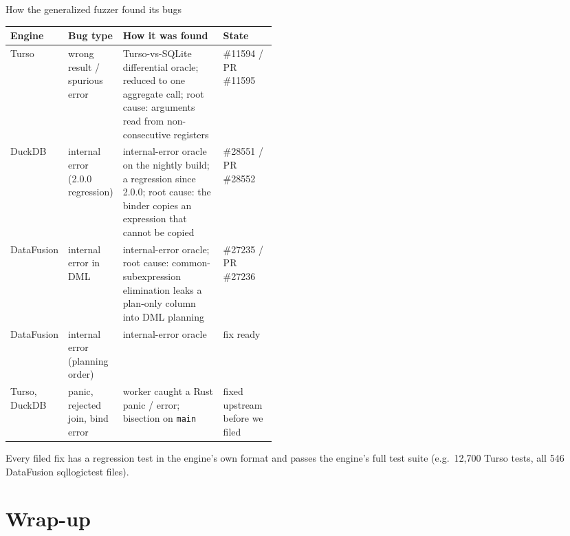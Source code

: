 \documentclass[aspectratio=169,10pt]{beamer}
\begin{document}
\begin{frame}{How the generalized fuzzer found its bugs}
\scriptsize
\begin{tabularx}{\linewidth}{@{}L{0.09\linewidth}L{0.16\linewidth}YL{0.2\linewidth}@{}}
\toprule
Engine & Bug type & How it was found & State \\
\midrule
Turso & wrong result / spurious error & Turso-vs-SQLite differential oracle; reduced to one aggregate call; root cause: arguments read from non-consecutive registers &  \#11594 / PR \#11595 \\
DuckDB & internal error (2.0.0 regression) & internal-error oracle on the nightly build; a regression since 2.0.0; root cause: the binder copies an expression that cannot be copied &  \#28551 / PR \#28552 \\
DataFusion & internal error in DML & internal-error oracle; root cause: common-subexpression elimination leaks a plan-only column into DML planning &  \#27235 / PR \#27236 \\
DataFusion & internal error (planning order) & internal-error oracle & fix ready \\
Turso, DuckDB & panic, rejected join, bind error & worker caught a Rust panic / error; bisection on \texttt{main} & fixed upstream before we filed \\
\bottomrule
\end{tabularx}

\medskip
\small Every filed fix has a regression test in the engine's own format and passes the engine's full test suite (e.g.\ 12{,}700 Turso tests, all 546 DataFusion sqllogictest files).
\end{frame}

\section{Wrap-up}
\end{document}
